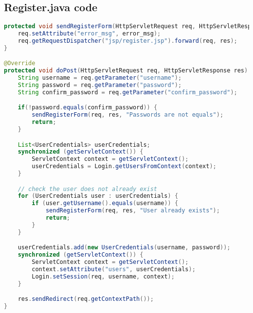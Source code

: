 \subsection{Register.java code}
\begin{lstlisting}[language=java, caption={POST method for registration page}]
protected void sendRegisterForm(HttpServletRequest req, HttpServletResponse res, String error_msg) throws IOException, ServletException {
    req.setAttribute("error_msg", error_msg);
    req.getRequestDispatcher("jsp/register.jsp").forward(req, res);
}

@Override
protected void doPost(HttpServletRequest req, HttpServletResponse res) throws IOException, ServletException {
    String username = req.getParameter("username");
    String password = req.getParameter("password");
    String confirm_password = req.getParameter("confirm_password");

    if(!password.equals(confirm_password)) {
        sendRegisterForm(req, res, "Passwords are not equals");
        return;
    }

    List<UserCredentials> userCredentials;
    synchronized (getServletContext()) {
        ServletContext context = getServletContext();
        userCredentials = Login.getUsersFromContext(context);
    }

    // check the user does not already exist
    for (UserCredentials user : userCredentials) {
        if (user.getUsername().equals(username)) {
            sendRegisterForm(req, res, "User already exists");
            return;
        }
    }

    userCredentials.add(new UserCredentials(username, password));
    synchronized (getServletContext()) {
        ServletContext context = getServletContext();
        context.setAttribute("users", userCredentials);
        Login.setSession(req, username, context);
    }

    res.sendRedirect(req.getContextPath());
}
\end{lstlisting}